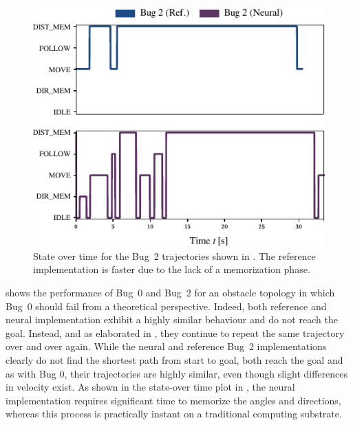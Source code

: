 \documentclass[letterpaper,10pt,conference]{ieeeconf}
\begin{document}
\begin{figure}
	\centering
	\includegraphics{media/vis_trace_map_demo_03_bug_2_ref_bug_2_neural.pdf}
	\caption{State over time for the Bug~2 trajectories shown in . The reference implementation is faster due to the lack of a memorization phase.}
	\label{fig:experiment_1_states}
\end{figure}
 shows the performance of Bug~0 and Bug~2 for an obstacle topology in which Bug~0 should fail from a theoretical perspective. Indeed, both reference and neural implementation exhibit a highly similar behaviour and do not reach the goal. Instead, and as elaborated in , they continue to repeat the same trajectory over and over again. While the neural and reference Bug~2 implementations clearly do not find the shortest path from start to goal, both reach the goal and as with Bug 0, their trajectories are highly similar, even though slight differences in velocity exist. As shown in the state-over time plot in , the neural implementation requires significant time to memorize the angles and directions, whereas this process is practically instant on a traditional computing substrate.
\end{document}
